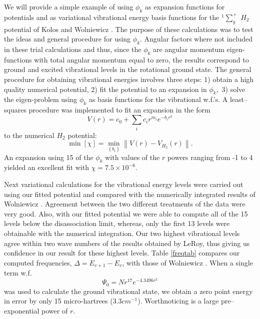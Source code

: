 We will provide a simple example of using $\phi _k$ as expansion functions
for potentials and as variational vibrational energy basis functions for 
the $^1\sum_g^{+}$ $H_2$ potential of Kolos and 
Wolniewicz \cite{Kolos65}. 
The purpose of these calculations was to test the ideas and general
procedure for using $\phi _k$. Angular factors where not included in these
trial calculations and thus, since the $\phi _k$ are angular momentum
eigen-functions with total angular momentum equal to zero, the results 
correspond to
ground and excited vibrational levels in the rotational ground state. 
The general procedure for obtaining vibrational energies involves three
steps: 1) obtain a high quality numerical potential, 2) fit the potential to
an expansion in $\phi _k,$ 3) solve the eigen-problem using $\phi _k$ as
basis functions for the vibrational w.f.'s. 
A least--squares procedure 
was implemented to fit an expansion in the form 
\begin{equation}
V\left( r\right) =c_0+\sum_ic_ir^{m_i}e^{-b_ir^2}
\end{equation}
to the numerical $H_2$ potential:
\begin{equation}
\min \left[ \chi \right] =\min_{\left\{ b_i\right\} }\left\| 
V\left( r \right) -V_{H_2}\left( r \right) \right\| .
\end{equation}
An expansion using 15 of the $\phi _k$
with values of the $r$ powers ranging from -1 to 4 yielded an excellent fit
with $\chi =7.5\times 10^{-6}.$ 

Next variational calculations 
for the vibrational energy levels were carried out
using our fitted potential and compared with the numerically integrated
results of Wolniewicz \cite{Wolniewicz66}. Agreement between the two
different treatments of the data were very good. Also, with our fitted
potential we were able to compute all of the 15 levels below the
disassociation limit, whereas, only the first 13 levels were obtainable with
the numerical integration. Our two highest vibrational levels agree within
two wave numbers of the results obtained by LeRoy\cite{LeRoy68},
thus giving us confidence in our result for these highest levels.
Table \ref{freqtab} compares our computed
frequencies, $\Delta = E_{v+1}-E_v$, 
with those of Wolniewicz \cite{Wolniewicz66}.
When a single term w.f. 
\begin{equation}
\Psi _0=Nr^{17}e^{-4.3496r^2}
\end{equation}
was used to calculate the ground vibrational state,
we obtain a zero point energy in error
by only 15 micro-hartrees (3.3$cm^{-1}$).
Worthnoticing is a large pre--exponential power of $r$.

